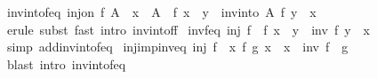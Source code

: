 \begin{isabellebody}
\endisatagproof
{\isafoldproof}%
%
\isadelimproof
\isanewline
%
\endisadelimproof
\isanewline
{}\isamarkupfalse%
\ inv{\isacharunderscore}{\kern0pt}into{\isacharunderscore}{\kern0pt}f{\isacharunderscore}{\kern0pt}eq{\isacharcolon}{\kern0pt}\ {\isachardoublequoteopen}inj{\isacharunderscore}{\kern0pt}on\ f\ A\ {\isasymLongrightarrow}\ x\ {\isasymin}\ A\ {\isasymLongrightarrow}\ f\ x\ {\isacharequal}{\kern0pt}\ y\ {\isasymLongrightarrow}\ inv{\isacharunderscore}{\kern0pt}into\ A\ f\ y\ {\isacharequal}{\kern0pt}\ x{\isachardoublequoteclose}\isanewline
%
\isadelimproof
\ \ %
\endisadelimproof
%
\isatagproof
{}\isamarkupfalse%
\ {\isacharparenleft}{\kern0pt}erule\ subst{\isacharparenright}{\kern0pt}\ {\isacharparenleft}{\kern0pt}fast\ intro{\isacharcolon}{\kern0pt}\ inv{\isacharunderscore}{\kern0pt}into{\isacharunderscore}{\kern0pt}f{\isacharunderscore}{\kern0pt}f{\isacharparenright}{\kern0pt}%
\endisatagproof
{\isafoldproof}%
%
\isadelimproof
\isanewline
%
\endisadelimproof
\isanewline
{}\isamarkupfalse%
\ inv{\isacharunderscore}{\kern0pt}f{\isacharunderscore}{\kern0pt}eq{\isacharcolon}{\kern0pt}\ {\isachardoublequoteopen}inj\ f\ {\isasymLongrightarrow}\ f\ x\ {\isacharequal}{\kern0pt}\ y\ {\isasymLongrightarrow}\ inv\ f\ y\ {\isacharequal}{\kern0pt}\ x{\isachardoublequoteclose}\isanewline
%
\isadelimproof
\ \ %
\endisadelimproof
%
\isatagproof
{}\isamarkupfalse%
\ {\isacharparenleft}{\kern0pt}simp\ add{\isacharcolon}{\kern0pt}inv{\isacharunderscore}{\kern0pt}into{\isacharunderscore}{\kern0pt}f{\isacharunderscore}{\kern0pt}eq{\isacharparenright}{\kern0pt}%
\endisatagproof
{\isafoldproof}%
%
\isadelimproof
\isanewline
%
\endisadelimproof
\isanewline
{}\isamarkupfalse%
\ inj{\isacharunderscore}{\kern0pt}imp{\isacharunderscore}{\kern0pt}inv{\isacharunderscore}{\kern0pt}eq{\isacharcolon}{\kern0pt}\ {\isachardoublequoteopen}inj\ f\ {\isasymLongrightarrow}\ {\isasymforall}x{\isachardot}{\kern0pt}\ f\ {\isacharparenleft}{\kern0pt}g\ x{\isacharparenright}{\kern0pt}\ {\isacharequal}{\kern0pt}\ x\ {\isasymLongrightarrow}\ inv\ f\ {\isacharequal}{\kern0pt}\ g{\isachardoublequoteclose}\isanewline
%
\isadelimproof
\ \ %
\endisadelimproof
%
\isatagproof
{}\isamarkupfalse%
\ {\isacharparenleft}{\kern0pt}blast\ intro{\isacharcolon}{\kern0pt}\ inv{\isacharunderscore}{\kern0pt}into{\isacharunderscore}{\kern0pt}f{\isacharunderscore}{\kern0pt}eq{\isacharparenright}{\kern0pt}%
\endisatagproof
{\isafoldproof}%
%
\isadelimproof
%
\endisadelimproof
%
\begin{isamarkuptext}%

\end{isamarkuptext}
\end{isabellebody}
